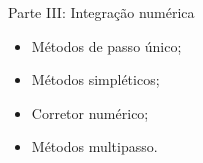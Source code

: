 %
\begin{frame}[plain]
    \centering
    \vspace{0.5cm}
    \Huge Parte III: Integração numérica
    
    \vspace{0.7cm}
    \large
    \begin{itemize}
        \item Métodos de passo único;
        \item Métodos simpléticos;
        \item Corretor numérico;
        \item Métodos multipasso.
    \end{itemize}
\end{frame}


